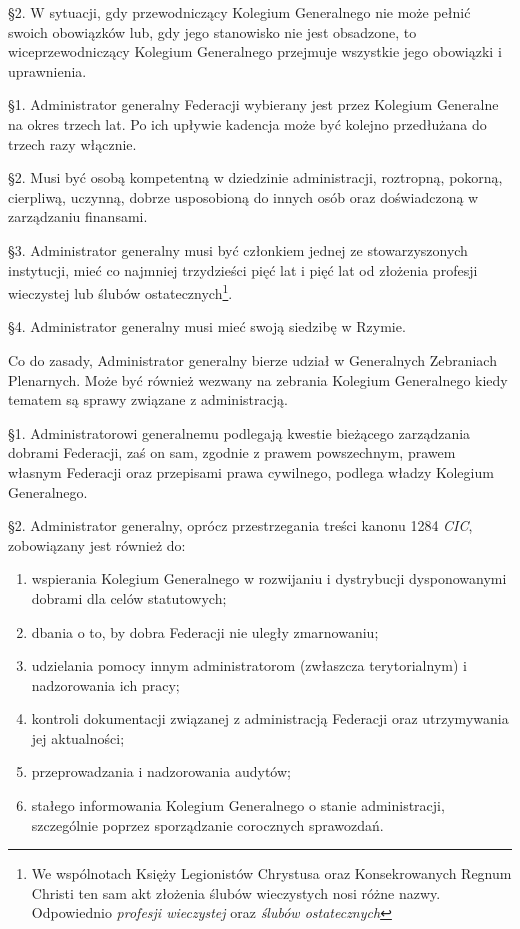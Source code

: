 \S{}2. W sytuacji, gdy przewodniczący Kolegium Generalnego nie może pełnić swoich obowiązków lub, gdy jego stanowisko nie jest obsadzone, to wiceprzewodniczący Kolegium Generalnego przejmuje wszystkie jego obowiązki i uprawnienia.
 


 \S{}1. Administrator generalny Federacji wybierany jest przez Kolegium Generalne na okres trzech lat. Po ich upływie kadencja może być kolejno przedłużana do trzech razy włącznie.


\S{}2. Musi być osobą kompetentną w dziedzinie administracji, roztropną, pokorną, cierpliwą, uczynną, dobrze usposobioną do innych osób oraz doświadczoną w zarządzaniu finansami.


\S{}3. Administrator generalny musi być członkiem jednej ze stowarzyszonych instytucji, mieć co najmniej trzydzieści pięć lat i pięć lat od złożenia profesji wieczystej lub ślubów ostatecznych\footnote{We wspólnotach Księży Legionistów Chrystusa oraz Konsekrowanych Regnum Christi ten sam akt złożenia ślubów wieczystych nosi różne nazwy. Odpowiednio {\em profesji wieczystej} oraz {\em ślubów ostatecznych}}.


\S{}4. Administrator generalny musi mieć swoją siedzibę w Rzymie.
 
 Co do zasady, Administrator generalny bierze udział w Generalnych Zebraniach Plenarnych. Może być również wezwany na zebrania Kolegium Generalnego kiedy tematem są sprawy związane z administracją.




 \S{}1. Administratorowi generalnemu podlegają kwestie bieżącego zarządzania dobrami Federacji, zaś on sam, zgodnie z prawem powszechnym, prawem własnym Federacji oraz przepisami prawa cywilnego, podlega władzy Kolegium Generalnego.


\S{}2. Administrator generalny, oprócz przestrzegania treści kanonu 1284 {\em CIC}, zobowiązany jest również do:


\begin{enumerate}


\item wspierania Kolegium Generalnego w rozwijaniu i dystrybucji dysponowanymi dobrami dla celów statutowych;


\item dbania o to, by dobra Federacji nie uległy zmarnowaniu;


\item udzielania pomocy innym administratorom (zwłaszcza terytorialnym) i nadzorowania ich pracy;


\item kontroli dokumentacji związanej z administracją Federacji oraz utrzymywania jej aktualności;


\item przeprowadzania i nadzorowania audytów;


\item stałego informowania Kolegium Generalnego o stanie administracji, szczególnie poprzez sporządzanie corocznych sprawozdań.


\end{enumerate}
 

